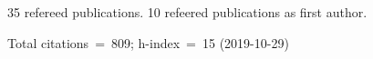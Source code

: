 35 refereed publications. 10 refeered publications as first author.

Total citations~=~809; h-index~=~15 (2019-10-29)